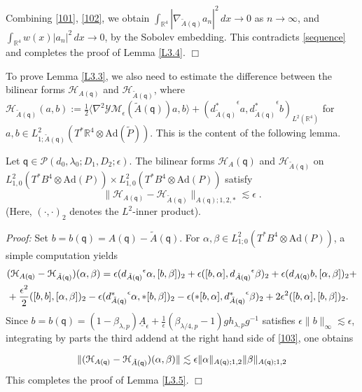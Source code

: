 \documentclass[11pt]{article}
\numberwithin{equation}{section} \setlength{\topmargin}{-35pt}
\newcommand{\PP}{\mathcal{P}}
\newcommand{\R}{\mathbb{R}}
\newcommand{\Ad}{\text{Ad}}
\newcommand{\YM}{\mathcal{YM}}
\newcommand{\q}{\mathsf{q}}
\begin{document}
Combining \eqref{101}, \eqref{102}, we obtain
$\int_{\R^4}|\nabla_{\tilde{A}(\q)}a_n|^2\,dx\to0$ as $n\to\infty$,
and $\int_{\R^4}w(x)|a_n|^2\,dx\to 0$, by the Sobolev embedding.
This contradicts \eqref{sequence} and completes the proof of Lemma
\ref{L3.4}. \hfill$\Box$

\medskip

To prove Lemma \ref{L3.3}, we also need to estimate the difference
between the bilinear forms $\mathcal{H}_{A(\q)}$ and
$\mathcal{H}_{\tilde{A}(\q)}$, where
$\mathcal{H}_{\tilde{A}(\q)}(a,b):=\frac{1}{2}\langle\nabla^2\YM_{\epsilon}(\tilde{A}(\q))a,b\rangle+
({d_{\tilde{A}(\q)}^{\ast}}^{\epsilon}a,{d_{\tilde{A}(\q)}^{\ast}}^{\epsilon}b)_{L^2(\R^4)}$
for $a,b\in
L^2_{1;\tilde{A}(\q)}(T^{\ast}\R^4\otimes\Ad(\tilde{P}))$. This is
the content of the following lemma.
\begin{lemma} \label{L3.5} Let $\q\in\PP(d_0,\lambda_0;D_1,D_2;\epsilon)$.
The bilinear forms $\mathcal{H}_{A}(\q)$ and
$\mathcal{H}_{\tilde{A}(\q)}$ on $L^2_{1,0}(T^{\ast}B^4\otimes\Ad
(P))\times L^2_{1,0}(T^{\ast}B^4\otimes\Ad(P))$ satisfy
$$\|\mathcal{H}_{A(\q)}-\mathcal{H}_{\tilde{A}(\q)}\|_{A(\q);1,2,\ast}\lesssim\epsilon\;.$$
(Here, $(\cdot,\cdot)_2$ denotes the $L^2$-inner product).
\end{lemma}

\textit{Proof:} Set $b=b(\q)=A(\q)-\tilde{A}(\q)$. For
$\alpha,\beta\in L^2_{1;0}(T^{\ast}B^4\otimes\Ad(P))$, a simple
computation yields
\begin{align}
\label{103}
 &(\mathcal{H}_{A(\q)}-\mathcal{H}_{\tilde{A}(\q)})(\alpha,\beta)
=\epsilon({d_{\tilde{A}(\q)}}^{\epsilon}\alpha,[b,\beta])_2+\epsilon([b,\alpha],{d_{\tilde{A}(\q)}}^{\epsilon}\beta)_2+
\epsilon(d_{A(\q)}b,[\alpha,\beta])_2+
\notag\\
&+\frac{\epsilon^2}{2}([b,b],[\alpha,\beta])_2-\epsilon({d_{\tilde{A}(\q)}^{\ast}}^{\epsilon}\alpha,\ast[b,\beta])_2-
\epsilon(\ast[b,\alpha],{d_{\tilde{A}(\q)}^{\ast}}^{\epsilon}\beta)_2+
2\epsilon^2([b,\alpha],[b,\beta])_2.
\end{align}
Since
$b=b(\q)=(1-\beta_{\lambda,p})\underline{A}_{\epsilon}+\frac{1}{\epsilon}(\beta_{\lambda/4,p}-1)gh_{\lambda,p}g^{-1}$
satisfies $\epsilon\|b\|_{\infty}\lesssim\epsilon$, integrating by
parts the third addend at the right hand side of \eqref{103}, one
obtains

\begin{equation}
\notag
\|(\mathcal{H}_{A(\q)}-\mathcal{H}_{\tilde{A}(\q)})(\alpha,\beta)\|\lesssim\epsilon
\|\alpha\|_{A(\q);1,2}\|\beta\|_{A(\q);1,2}
\end{equation}
This completes the proof of Lemma \ref{L3.5}. \hfill$\Box$
\end{document}
